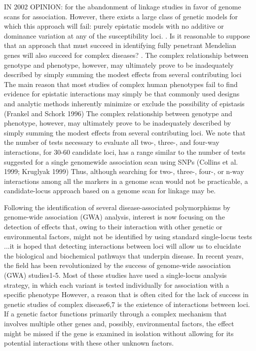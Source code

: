 IN 2002 OPINION: for the abandonment of linkage studies in favor of genome scans for association. However, there exists a large class of genetic models for which this approach will fail: purely epistatic models with no additive or dominance variation at any of the susceptibility loci. \cite{culverhouse2002perspective}. Is it reasonable to suppose that an approach that must succeed in identifying fully penetrant Mendelian genes will also succeed for complex diseases?  \cite{culverhouse2002perspective}. The complex relationship between genotype and phenotype, however, may ultimately prove to be inadequately described by simply summing the modest effects from several contributing loci \cite{culverhouse2002perspective}
The main reason that most studies of complex human phenotypes fail to find evidence for epistatic interactions may simply be that commonly used designs and analytic methods inherently minimize or exclude the possibility of epistasis (Frankel and Schork 1996) \cite{culverhouse2002perspective}
The complex relationship between genotype and phenotype, however, may ultimately prove to be inadequately described by simply summing the modest effects from several contributing loci. \cite{culverhouse2002perspective}
We note that the number of tests necessary to evaluate all two-, three-, and four-way interactions, for 30-60 candidate loci, has a range similar to the number of tests suggested for a single genomewide association scan using SNPs (Collins et al. 1999; Kruglyak 1999) \cite{culverhouse2002perspective}
Thus, although searching for two-, three-, four-, or n-way interactions among all the markers in a genome scan would not be practicable, a candidate-locus approach based on a genome scan for linkage may be. \cite{culverhouse2002perspective}



Following the identification of several disease-associated polymorphisms by genome-wide association (GWA) analysis, interest is now focusing on the detection of effects that, owing to their interaction with other genetic or environmental factors, might not be identified by using standard single-locus tests \cite{cordell2009detecting}
...it is hoped that detecting interactions between loci will allow us to elucidate the biological and biochemical pathways that underpin disease.  \cite{cordell2009detecting}
In recent years, the field has been revolutionized by the success of genome-wide association (GWA) studies1-5. Most of these studies have used a single-locus analysis strategy, in which each variant is tested individually for association with a specific phenotype \cite{cordell2009detecting}
However, a reason that is often cited for the lack of success in genetic studies of complex disease6,7 is the existence of interactions between loci.  \cite{cordell2009detecting}
If a genetic factor functions primarily through a complex mechanism that involves multiple other genes and, possibly, environmental factors, the effect might be missed if the gene is examined in isolation without allowing for its potential interactions with these other unknown factors. \cite{cordell2009detecting}


